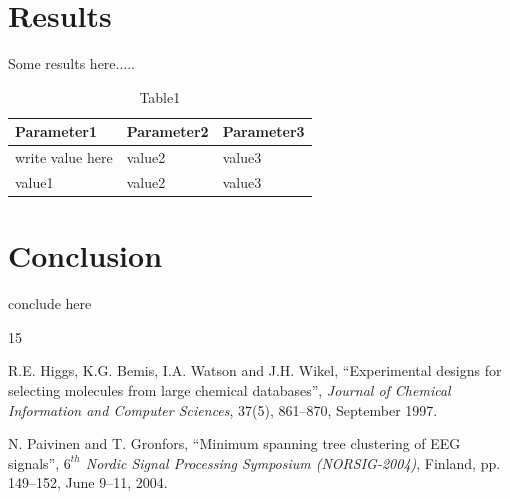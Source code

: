 \chapter{Results}
Some results here.....

\begin{table}[ht]
\centering
\caption{Table1}
\label{my-label}
\begin{tabular}{|l|l|l|}
\hline
Parameter1 & Parameter2 & Parameter3 \\ \hline
write value here & value2 & value3 \\ \hline
value1 & value2 & value3 \\ \hline
\end{tabular}
\end{table}

\chapter{Conclusion}
conclude here

\begin{thebibliography}{15}

R.E. Higgs, K.G. Bemis, I.A. Watson and J.H. Wikel, 
“Experimental designs for selecting molecules from large chemical databases”, 
\textit{Journal of Chemical Information and Computer Sciences}, 
37(5), 861–870, September 1997.

N. Paivinen and T. Gronfors, 
“Minimum spanning tree clustering of EEG signals”, 
\textit{$6^{th}$ Nordic Signal Processing Symposium (NORSIG-2004)}, 
Finland, pp. 149–152, June 9–11, 2004.

\end{thebibliography}

\pagebreak
